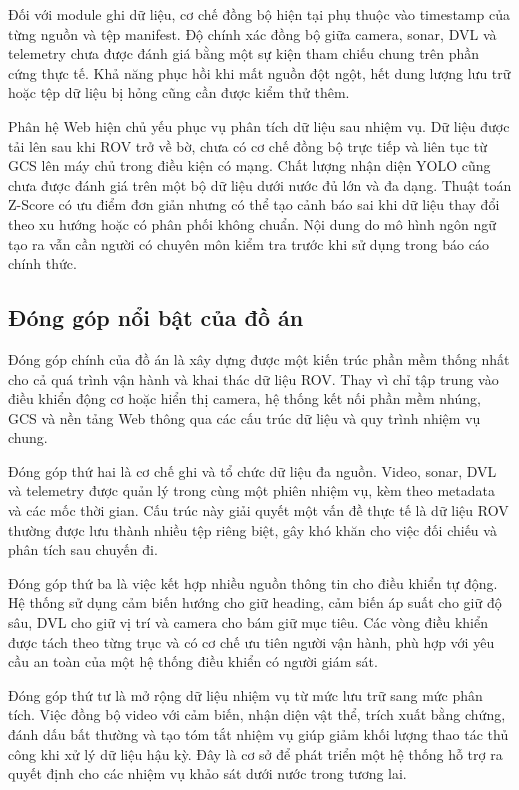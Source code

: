 \documentclass[../DoAn.tex]{subfiles}
\begin{document}
Đối với module ghi dữ liệu, cơ chế đồng bộ hiện tại phụ thuộc vào timestamp của từng nguồn và tệp manifest. Độ chính xác đồng bộ giữa camera, sonar, DVL và telemetry chưa được đánh giá bằng một sự kiện tham chiếu chung trên phần cứng thực tế. Khả năng phục hồi khi mất nguồn đột ngột, hết dung lượng lưu trữ hoặc tệp dữ liệu bị hỏng cũng cần được kiểm thử thêm.

Phân hệ Web hiện chủ yếu phục vụ phân tích dữ liệu sau nhiệm vụ. Dữ liệu được tải lên sau khi ROV trở về bờ, chưa có cơ chế đồng bộ trực tiếp và liên tục từ GCS lên máy chủ trong điều kiện có mạng. Chất lượng nhận diện YOLO cũng chưa được đánh giá trên một bộ dữ liệu dưới nước đủ lớn và đa dạng. Thuật toán Z-Score có ưu điểm đơn giản nhưng có thể tạo cảnh báo sai khi dữ liệu thay đổi theo xu hướng hoặc có phân phối không chuẩn. Nội dung do mô hình ngôn ngữ tạo ra vẫn cần người có chuyên môn kiểm tra trước khi sử dụng trong báo cáo chính thức.

\subsection{Đóng góp nổi bật của đồ án}

Đóng góp chính của đồ án là xây dựng được một kiến trúc phần mềm thống nhất cho cả quá trình vận hành và khai thác dữ liệu ROV. Thay vì chỉ tập trung vào điều khiển động cơ hoặc hiển thị camera, hệ thống kết nối phần mềm nhúng, GCS và nền tảng Web thông qua các cấu trúc dữ liệu và quy trình nhiệm vụ chung.

Đóng góp thứ hai là cơ chế ghi và tổ chức dữ liệu đa nguồn. Video, sonar, DVL và telemetry được quản lý trong cùng một phiên nhiệm vụ, kèm theo metadata và các mốc thời gian. Cấu trúc này giải quyết một vấn đề thực tế là dữ liệu ROV thường được lưu thành nhiều tệp riêng biệt, gây khó khăn cho việc đối chiếu và phân tích sau chuyến đi.

Đóng góp thứ ba là việc kết hợp nhiều nguồn thông tin cho điều khiển tự động. Hệ thống sử dụng cảm biến hướng cho giữ heading, cảm biến áp suất cho giữ độ sâu, DVL cho giữ vị trí và camera cho bám giữ mục tiêu. Các vòng điều khiển được tách theo từng trục và có cơ chế ưu tiên người vận hành, phù hợp với yêu cầu an toàn của một hệ thống điều khiển có người giám sát.

Đóng góp thứ tư là mở rộng dữ liệu nhiệm vụ từ mức lưu trữ sang mức phân tích. Việc đồng bộ video với cảm biến, nhận diện vật thể, trích xuất bằng chứng, đánh dấu bất thường và tạo tóm tắt nhiệm vụ giúp giảm khối lượng thao tác thủ công khi xử lý dữ liệu hậu kỳ. Đây là cơ sở để phát triển một hệ thống hỗ trợ ra quyết định cho các nhiệm vụ khảo sát dưới nước trong tương lai.
\end{document}
